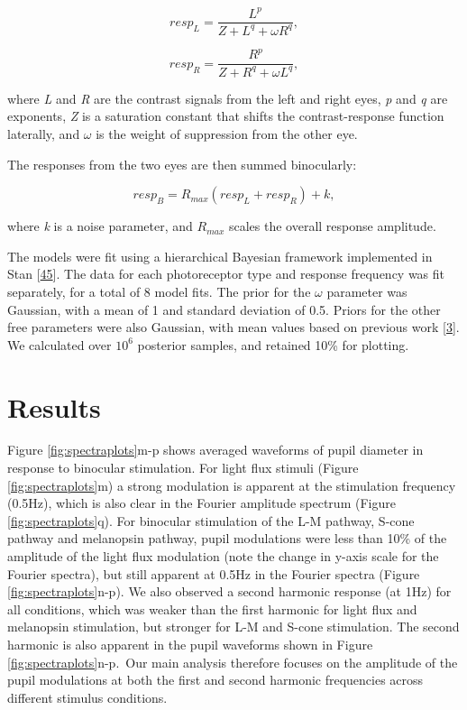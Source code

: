 \documentclass[
]{article}
\begin{document}
\begin{equation}
\label{eq:respL}
resp_L = \frac{L^p}{Z + L^q + \omega R^q},
\end{equation}

\begin{equation}
\label{eq:respR}
resp_R = \frac{R^p}{Z + R^q + \omega L^q},
\end{equation}

\noindent where \emph{L} and \emph{R} are the contrast signals from the left and right eyes, \emph{p} and \emph{q} are exponents, \emph{Z} is a saturation constant that shifts the contrast-response function laterally, and \(\omega\) is the weight of suppression from the other eye.

The responses from the two eyes are then summed binocularly:

\begin{equation}
\label{eq:respB}
resp_B = R_{max}(resp_L + resp_R) + k,
\end{equation}

\noindent where \emph{k} is a noise parameter, and \(R_{max}\) scales the overall response amplitude.

The models were fit using a hierarchical Bayesian framework implemented in Stan {[}\protect\hyperlink{ref-Carpenter2017}{45}{]}. The data for each photoreceptor type and response frequency was fit separately, for a total of 8 model fits. The prior for the \(\omega\) parameter was Gaussian, with a mean of 1 and standard deviation of 0.5. Priors for the other free parameters were also Gaussian, with mean values based on previous work {[}\protect\hyperlink{ref-Segala2023}{3}{]}. We calculated over \ensuremath{10^{6}} posterior samples, and retained 10\% for plotting.

\hypertarget{results}{%
\section{Results}\label{results}}

Figure \ref{fig:spectraplots}m-p shows averaged waveforms of pupil diameter in response to binocular stimulation. For light flux stimuli (Figure \ref{fig:spectraplots}m) a strong modulation is apparent at the stimulation frequency (0.5Hz), which is also clear in the Fourier amplitude spectrum (Figure \ref{fig:spectraplots}q). For binocular stimulation of the L-M pathway, S-cone pathway and melanopsin pathway, pupil modulations were less than 10\% of the amplitude of the light flux modulation (note the change in y-axis scale for the Fourier spectra), but still apparent at 0.5Hz in the Fourier spectra (Figure \ref{fig:spectraplots}n-p). We also observed a second harmonic response (at 1Hz) for all conditions, which was weaker than the first harmonic for light flux and melanopsin stimulation, but stronger for L-M and S-cone stimulation. The second harmonic is also apparent in the pupil waveforms shown in Figure \ref{fig:spectraplots}n-p.~Our main analysis therefore focuses on the amplitude of the pupil modulations at both the first and second harmonic frequencies across different stimulus conditions.
\end{document}
